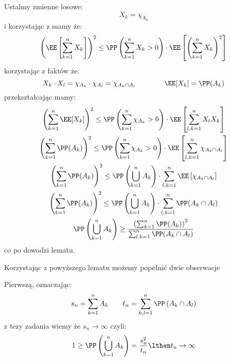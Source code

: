 \documentclass[11pt]{scrartcl}
\begin{document}
    Ustalmy zmienne losowe:
    \[
        X_k = \chi_{A_k}
    \]
    i korzystając z  mamy że:
    \[
        \left ( \EE \left [ \sum_{k = 1}^{n} X_k \right ] \right )^2 \leq 
        \PP \left ( \sum_{k=1}^{n} X_k > 0 \right ) \cdot 
        \EE \left [ \left ( \sum_{k=1}^{n} X_k \right )^2 \right ]
    \]
    korzystając z faktów że:
    \[
        X_k \cdot X_l = \chi_{A_k} \cdot \chi_{A_l} = \chi_{A_k \cap A_l}
        \qquad \qquad \EE [X_k] = \PP (A_k)
    \]
    przekształcając mamy:
    \begin{gather*}
        \left ( \sum_{k = 1}^{n} \EE [ X_k ] \right )^2 \leq 
        \PP \left ( \sum_{k=1}^{n} \chi_{A_k} > 0 \right ) \cdot 
        \EE \left [ \sum_{l,k=1}^{n} X_l X_k \right ] 
        \\
        \left ( \sum_{k = 1}^{n} \PP (A_k) \right )^2 \leq 
        \PP \left ( \sum_{k=1}^{n} \chi_{A_k} > 0 \right ) \cdot 
        \EE \left [ \sum_{l,k=1}^{n} \chi_{A_k \cap A_l} \right ] 
        \\
        \left ( \sum_{k = 1}^{n} \PP (A_k) \right )^2 \leq 
        \PP \left ( \bigcup_{k=1}^{n} A_k \right ) \cdot 
        \sum_{l,k=1}^{n} \EE \left [ \chi_{A_k \cap A_l} \right ]
        \\
        \left ( \sum_{k = 1}^{n} \PP (A_k) \right )^2 \leq 
        \PP \left ( \bigcup_{k=1}^{n} A_k \right ) \cdot 
        \sum_{l,k=1}^{n} \PP (A_k \cap A_l)
        \\
        \PP \left ( \bigcup_{k=1}^{n} A_k \right ) \geq
        \frac{
            \left ( \sum_{k = 1}^{n} \PP (A_k) \right )^2
        }{
            \sum_{l,k=1}^{n} \PP (A_k \cap A_l)
        }
    \end{gather*}  
    co po dowodzi lematu.

    Korzystając z powyższego lematu możemy popełnić dwie obserwacje 

    Pierwszą, oznaczając:
    \begin{gather*}
        s_n = \sum_{k=1}^{n} A_k \qquad  
        t_n = \sum_{k,l = 1}^{n} \PP \left ( A_k \cap A_l \right )
    \end{gather*}
    z tezy zadania wiemy że $s_n \to \infty $ czyli:
    \[
        1 \geq \PP \left ( \bigcup_{k=1}^{n} A_k \right ) = 
        \frac{s_n^2}{t_n} \lthen t_n \to \infty 
    \]
\end{document}

